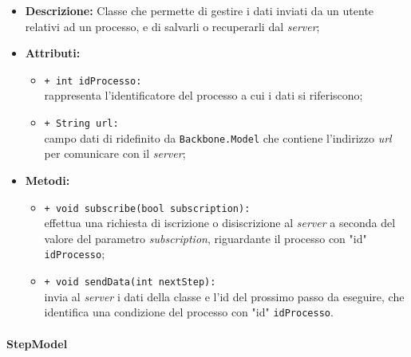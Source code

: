 \begin{flushleft}
\begin{itemize}
\item \textbf{Descrizione:} Classe che permette di gestire i dati inviati da un utente relativi ad un processo, e di salvarli o recuperarli dal \textit{server};
\item \textbf{Attributi:}
\begin{sloppypar}
\begin{itemize}
\item \texttt{+ int idProcesso:}\\ rappresenta l'identificatore del processo a cui i dati si riferiscono;
\item \texttt{+ String url:}\\ campo dati di ridefinito da \texttt{Backbone.Model} che contiene l'indirizzo \textit{url} per comunicare con il \textit{server};
\end{itemize}
\end{sloppypar}
\item \textbf{Metodi:}
\begin{sloppypar}
\begin{itemize}
\item \texttt{+ void subscribe(bool subscription):}\\ effettua una richiesta di iscrizione o disiscrizione al \textit{server} a seconda del valore del parametro \textit{subscription}, riguardante il processo con "id" \texttt{idProcesso};
\item \texttt{+ void sendData(int nextStep):}\\ invia al \textit{server} i dati della classe e l'id del prossimo passo da eseguire, che identifica una condizione del processo con "id" \texttt{idProcesso}.
\end{itemize}
\end{sloppypar}
\end{itemize}
\end{flushleft}

\paragraph{StepModel}
\label{stepModel}

